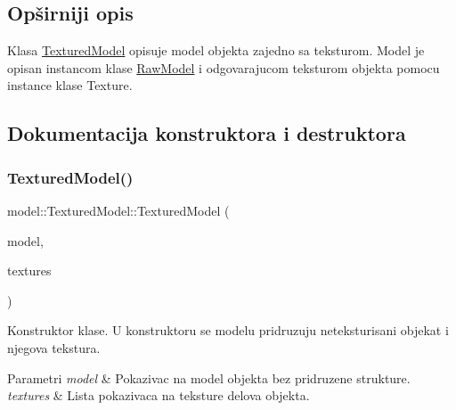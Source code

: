 \subsection{Opširniji opis}
Klasa \hyperlink{classmodel_1_1TexturedModel}{Textured\+Model} opisuje model objekta zajedno sa teksturom. Model je opisan instancom klase \hyperlink{classmodel_1_1RawModel}{Raw\+Model} i odgovarajucom teksturom objekta pomocu instance klase Texture. 

\subsection{Dokumentacija konstruktora i destruktora}
\mbox{\label{classmodel_1_1TexturedModel_aec5856afd9671aa31aa506f3452a616f}} 
\subsubsection{\texorpdfstring{Textured\+Model()}{TexturedModel()}}
{\footnotesize\ttfamily model\+::\+Textured\+Model\+::\+Textured\+Model (\begin{DoxyParamCaption}\item[{\hyperlink{classmodel_1_1RawModel}{Raw\+Model} $\ast$}]{model,  }\item[{vector$<$ \hyperlink{classtexture_1_1Texture}{Texture} $\ast$$>$}]{textures }\end{DoxyParamCaption})}



Konstruktor klase. U konstruktoru se modelu pridruzuju neteksturisani objekat i njegova tekstura. 


\begin{DoxyParams}{Parametri}
{\em model} & Pokazivac na model objekta bez pridruzene strukture. \\
\hline
{\em textures} & Lista pokazivaca na teksture delova objekta. \\
\hline
\end{DoxyParams}
\mbox{\label{classmodel_1_1TexturedModel_a8a11ba96d5a73a962a2ffcf8c5a53afe}} 
